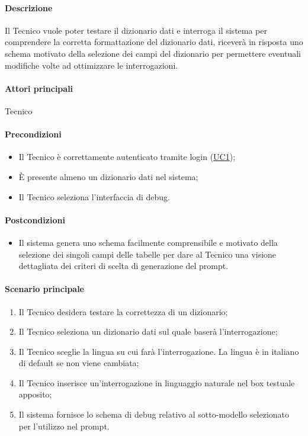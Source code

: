 \paragraph*{Descrizione} Il Tecnico vuole poter testare il dizionario dati e interroga il sistema per comprendere la corretta formattazione del dizionario dati, riceverà in risposta uno schema motivato della selezione dei campi del dizionario per permettere eventuali modifiche volte ad ottimizzare le interrogazioni.

\paragraph*{Attori principali} Tecnico

\paragraph*{Precondizioni}
\begin{itemize}
  \item Il Tecnico è correttamente autenticato tramite login (\hyperref[UC1]{UC1});
  \item È presente almeno un dizionario dati nel sistema;
  \item Il Tecnico seleziona l’interfaccia di debug.
\end{itemize}

\paragraph*{Postcondizioni}
\begin{itemize}
  \item Il sistema genera uno schema facilmente comprensibile e motivato della selezione dei singoli campi delle tabelle per dare al Tecnico una visione dettagliata dei criteri di scelta di generazione del prompt.
\end{itemize}

\paragraph*{Scenario principale}
\begin{enumerate}
  \item Il Tecnico desidera testare la correttezza di un dizionario; 
  \item Il Tecnico seleziona un dizionario dati sul quale baserà l’interrogazione;
  \item Il Tecnico sceglie la lingua su cui farà l’interrogazione. La lingua è in italiano di default se non viene cambiata;
  \item Il Tecnico inserisce un’interrogazione in linguaggio naturale nel box testuale apposito;
  \item Il sistema fornisce lo schema di debug relativo al sotto-modello selezionato per l’utilizzo nel prompt.  
\end{enumerate}

